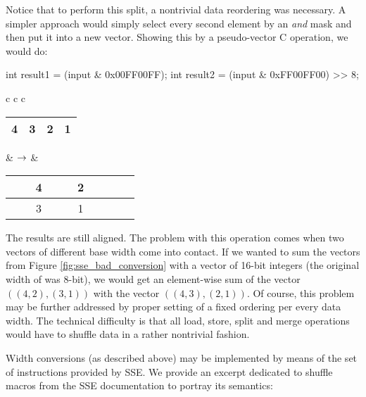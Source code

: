 Notice that to perform this split, a nontrivial data reordering was necessary. A simpler approach would simply select every second element by an \emph{and} mask and then put it into a new vector. Showing this by a pseudo-vector C operation, we would do:

\mybeginfig
\begin{code}
int result1 = (input & 0x00FF00FF);
int result2 = (input & 0xFF00FF00) >> 8; 
\end{code}
\begin{longtable}{ c c c }
\begin{tabular}{|c|c|c|c|}
\hline
 4 & 3 & 2 & 1 \tabularnewline
\hline
\end{tabular}
&
$\rightarrow$
&
\begin{tabular}{|c|c|c|c|c|c|c|c|}
\hline
 \ \ & 4 & \ \ & 2 \tabularnewline
\hline
 \ \ & 3 & \ \ & 1 \tabularnewline
\hline
\end{tabular}
\end{longtable}

The results are still aligned. The problem with this operation comes when two vectors of different base width come into contact. If we wanted to sum the vectors from Figure \ref{fig:sse_bad_conversion} with a vector of 16-bit integers (the original width of  was 8-bit), we would get an element-wise sum of the vector $((4,2),(3,1))$ with the vector $((4,3),(2,1))$. Of course, this problem may be further addressed by proper setting of a fixed ordering per every data width. The technical difficulty is that all load, store, split and merge operations would have to shuffle data in a rather nontrivial fashion. 


Width conversions (as described above) may be implemented by means of the set of  instructions provided by SSE. We provide an excerpt dedicated to shuffle macros from the SSE documentation \cite{reference} to portray its semantics: 





